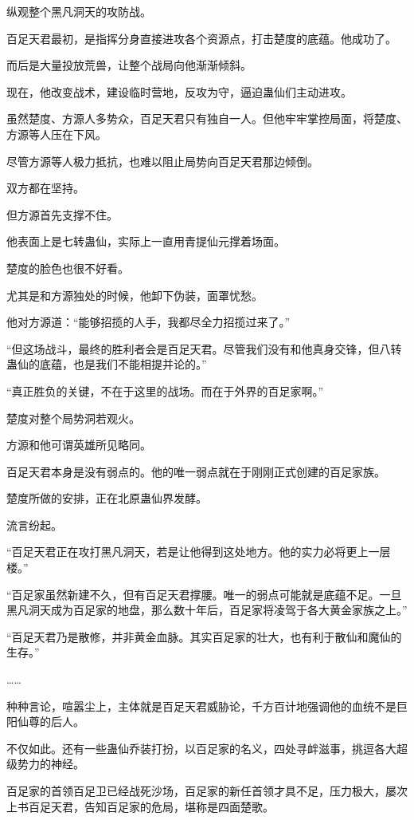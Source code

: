 \begin{this_body}
纵观整个黑凡洞天的攻防战。

百足天君最初，是指挥分身直接进攻各个资源点，打击楚度的底蕴。他成功了。

而后是大量投放荒兽，让整个战局向他渐渐倾斜。

现在，他改变战术，建设临时营地，反攻为守，逼迫蛊仙们主动进攻。

虽然楚度、方源人多势众，百足天君只有独自一人。但他牢牢掌控局面，将楚度、方源等人压在下风。

尽管方源等人极力抵抗，也难以阻止局势向百足天君那边倾倒。

双方都在坚持。

但方源首先支撑不住。

他表面上是七转蛊仙，实际上一直用青提仙元撑着场面。

楚度的脸色也很不好看。

尤其是和方源独处的时候，他卸下伪装，面罩忧愁。

他对方源道：“能够招揽的人手，我都尽全力招揽过来了。”

“但这场战斗，最终的胜利者会是百足天君。尽管我们没有和他真身交锋，但八转蛊仙的底蕴，也是我们不能相提并论的。”

“真正胜负的关键，不在于这里的战场。而在于外界的百足家啊。”

楚度对整个局势洞若观火。

方源和他可谓英雄所见略同。

百足天君本身是没有弱点的。他的唯一弱点就在于刚刚正式创建的百足家族。

楚度所做的安排，正在北原蛊仙界发酵。

流言纷起。

“百足天君正在攻打黑凡洞天，若是让他得到这处地方。他的实力必将更上一层楼。”

“百足家虽然新建不久，但有百足天君撑腰。唯一的弱点可能就是底蕴不足。一旦黑凡洞天成为百足家的地盘，那么数十年后，百足家将凌驾于各大黄金家族之上。”

“百足天君乃是散修，并非黄金血脉。其实百足家的壮大，也有利于散仙和魔仙的生存。”

……

种种言论，喧嚣尘上，主体就是百足天君威胁论，千方百计地强调他的血统不是巨阳仙尊的后人。

不仅如此。还有一些蛊仙乔装打扮，以百足家的名义，四处寻衅滋事，挑逗各大超级势力的神经。

百足家的首领百足卫已经战死沙场，百足家的新任首领才具不足，压力极大，屡次上书百足天君，告知百足家的危局，堪称是四面楚歌。


\end{this_body}
